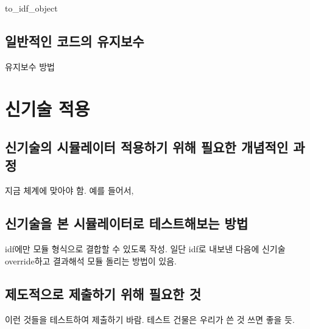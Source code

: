 to\_idf\_object 


\section{일반적인 코드의 유지보수}

유지보수 방법


\chapter{신기술 적용}

\section{신기술의 시뮬레이터 적용하기 위해 필요한 개념적인 과정}

지금 체계에 맞아야 함. 예를 들어서,


\section{신기술을 본 시뮬레이터로 테스트해보는 방법}

idf에만 모듈 형식으로 결합할 수 있도록 작성. 일단 idf로 내보낸 다음에 신기술 override하고 결과해석 모듈 돌리는 방법이 있음.


\section{제도적으로 제출하기 위해 필요한 것}

이런 것들을 테스트하여 제출하기 바람. 테스트 건물은 우리가 쓴 것 쓰면 좋을 듯.